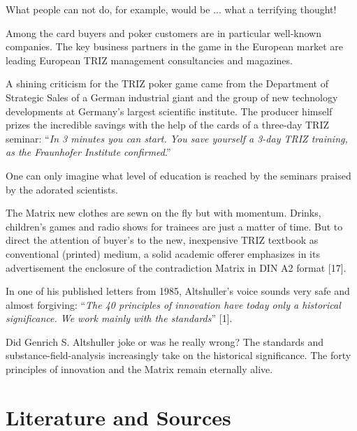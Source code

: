 \documentclass[11pt,a4paper]{article}
\begin{document}
What people can not do, for example, would be ... what a terrifying thought!

Among the card buyers and poker customers are in particular well-known
companies. The key business partners in the game in the European market are
leading European TRIZ management consultancies and magazines.

A shining criticism for the TRIZ poker game came from the Department of
Strategic Sales of a German industrial giant and the group of new technology
developments at Germany's largest scientific institute. The producer himself
prizes the incredible savings with the help of the cards of a three-day TRIZ
seminar: ``\emph{In 3 minutes you can start. You save yourself a 3-day TRIZ
training, as the Fraunhofer Institute confirmed}.'' 

One can only imagine what level of education is reached by the seminars
praised by the adorated scientists.

The Matrix new clothes are sewn on the fly but with momentum. Drinks,
children's games and radio shows for trainees are just a matter of time. But
to direct the attention of buyer's to the new, inexpensive TRIZ textbook as
conventional (printed) medium, a solid academic offerer emphasizes in its
advertisement the enclosure of the contradiction Matrix in DIN A2 format [17].

In one of his published letters from 1985, Altshuller's voice sounds very safe
and almost forgiving: ``\emph{The 40 principles of innovation have today only
  a historical significance. We work mainly with the standards}'' [1].

Did Genrich S. Altshuller joke or was he really wrong? The standards and
substance-field-analysis increasingly take on the historical significance.
The forty principles of innovation and the Matrix remain eternally alive.

\section*{Literature and Sources}
\end{document}
